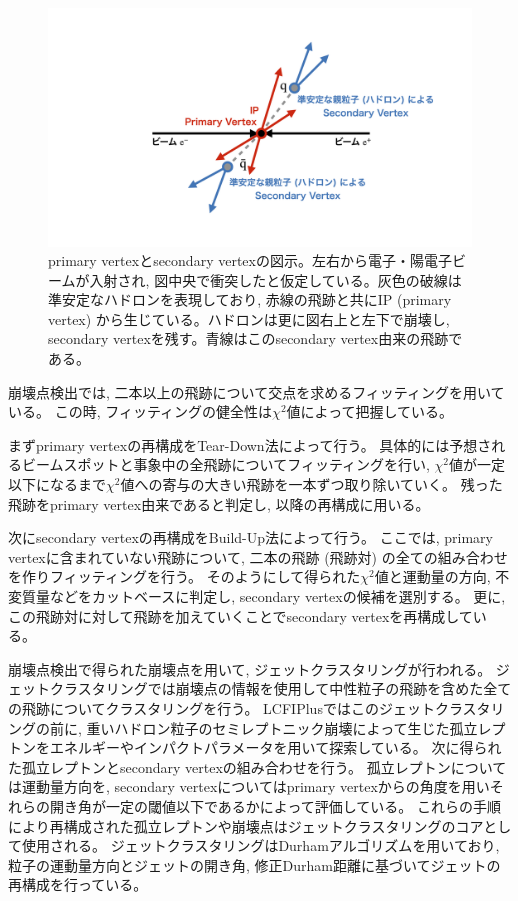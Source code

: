\begin{figure}[htbp]
 \centering
 \includegraphics[trim = 0 100 0 100, width=1.0\textwidth, clip]{Figure/1Introduction/6ReconstructedVertex.png}
 \caption[primary vertexとsecondary vertexの図示]{primary vertexとsecondary vertexの図示。左右から電子・陽電子ビームが入射され, 図中央で衝突したと仮定している。灰色の破線は準安定なハドロンを表現しており, 赤線の飛跡と共にIP (primary vertex) から生じている。ハドロンは更に図右上と左下で崩壊し, secondary vertexを残す。青線はこのsecondary vertex由来の飛跡である。}
 \label{6ReconstructedVertex}
\end{figure}

崩壊点検出では, 二本以上の飛跡について交点を求めるフィッティングを用いている。
この時, フィッティングの健全性は$\chi^2$値によって把握している。

まずprimary vertexの再構成をTear-Down法によって行う。
具体的には予想されるビームスポットと事象中の全飛跡についてフィッティングを行い, $\chi^2$値が一定以下になるまで$\chi^2$値への寄与の大きい飛跡を一本ずつ取り除いていく。
残った飛跡をprimary vertex由来であると判定し, 以降の再構成に用いる。

次にsecondary vertexの再構成をBuild-Up法によって行う。
ここでは, primary vertexに含まれていない飛跡について, 二本の飛跡 (飛跡対) の全ての組み合わせを作りフィッティングを行う。
そのようにして得られた$\chi^2$値と運動量の方向, 不変質量などをカットベースに判定し, secondary vertexの候補を選別する。
更に, この飛跡対に対して飛跡を加えていくことでsecondary vertexを再構成している。

崩壊点検出で得られた崩壊点を用いて, ジェットクラスタリングが行われる。
ジェットクラスタリングでは崩壊点の情報を使用して中性粒子の飛跡を含めた全ての飛跡についてクラスタリングを行う。
LCFIPlusではこのジェットクラスタリングの前に, 重いハドロン粒子のセミレプトニック崩壊によって生じた孤立レプトンをエネルギーやインパクトパラメータを用いて探索している。
次に得られた孤立レプトンとsecondary vertexの組み合わせを行う。
孤立レプトンについては運動量方向を, secondary vertexについてはprimary vertexからの角度を用いそれらの開き角が一定の閾値以下であるかによって評価している。
これらの手順により再構成された孤立レプトンや崩壊点はジェットクラスタリングのコアとして使用される。
ジェットクラスタリングはDurhamアルゴリズム\cite{Durhampaper}を用いており, 粒子の運動量方向とジェットの開き角, 修正Durham距離に基づいてジェットの再構成を行っている。

